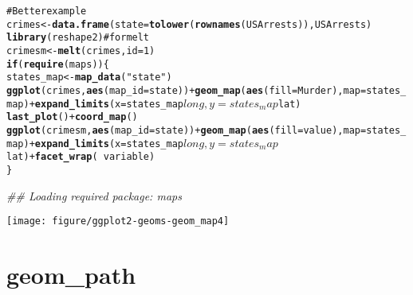 \documentclass[a4paper,titlepage]{tufte-handout}\usepackage{graphicx, color}
\makeatletter
\def\maxwidth{ %
  \ifdim\Gin@nat@width>\linewidth
    \linewidth
  \else
    \Gin@nat@width
  \fi
}
\newcommand{\hlfunctioncall}[1]{\textcolor[rgb]{0.501960784313725,0,0.329411764705882}{\textbf{#1}}}%
\newcommand{\hlstring}[1]{\textcolor[rgb]{0.6,0.6,1}{#1}}%
\newcommand{\hlcomment}[1]{\textcolor[rgb]{0.180392156862745,0.6,0.341176470588235}{#1}}%
\newenvironment{kframe}{%
 \def\at@end@of@kframe{}%
 \ifinner\ifhmode%
  \def\at@end@of@kframe{\end{minipage}}%
  \begin{minipage}{\columnwidth}%
 \fi\fi%
 \def\FrameCommand##1{\hskip\@totalleftmargin \hskip-\fboxsep
 \colorbox{shadecolor}{##1}\hskip-\fboxsep
     \hskip-\linewidth \hskip-\@totalleftmargin \hskip\columnwidth}%
 \MakeFramed {\advance\hsize-\width
   \@totalleftmargin\z@ \linewidth\hsize
   \@setminipage}}%
 {\par\unskip\endMakeFramed%
 \at@end@of@kframe}
\newenvironment{knitrout}{}{} %
\makeatother
\begin{document}
\begin{knitrout}
\begin{kframe}
\begin{alltt}
\hlcomment{# Better example}
crimes <- \hlfunctioncall{data.frame}(state = \hlfunctioncall{tolower}(\hlfunctioncall{rownames}(USArrests)), USArrests)
\hlfunctioncall{library}(reshape2) \hlcomment{# for melt}
crimesm <- \hlfunctioncall{melt}(crimes, id = 1)
\hlfunctioncall{if} (\hlfunctioncall{require}(maps)) \{
  states_map <- \hlfunctioncall{map_data}(\hlstring{"state"})
  \hlfunctioncall{ggplot}(crimes, \hlfunctioncall{aes}(map_id = state)) + \hlfunctioncall{geom_map}(\hlfunctioncall{aes}(fill = Murder), map = states_map) + \hlfunctioncall{expand_limits}(x = states_map$long, y = states_map$lat)
  \hlfunctioncall{last_plot}() + \hlfunctioncall{coord_map}()
  \hlfunctioncall{ggplot}(crimesm, \hlfunctioncall{aes}(map_id = state)) + \hlfunctioncall{geom_map}(\hlfunctioncall{aes}(fill = value), map = states_map) + \hlfunctioncall{expand_limits}(x = states_map$long, y = states_map$lat) + \hlfunctioncall{facet_wrap}( ~ variable)
\}
\end{alltt}


{\ttfamily\noindent\itshape\textcolor{messagecolor}{\#\# Loading required package: maps}}\end{kframe}\texttt{[image: figure/ggplot2-geoms-geom\_map4]} 
\end{knitrout}


\section{geom\_path}
\end{document}
